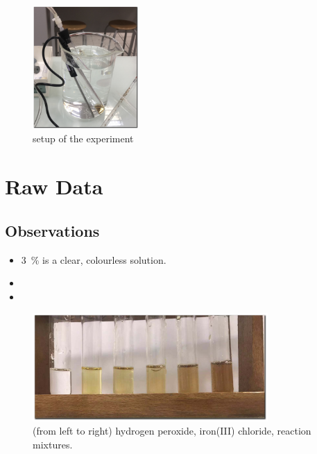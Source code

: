 \documentclass[a4paper, 12pt]{article}
\begin{document}
\begin{figure}[hbt]
    \centering
    \includegraphics[width=0.36\textwidth]{imgs/setup}
    \caption{setup of the experiment}
    \label{fig:setup}
\end{figure}


\section*{Raw Data}
\subsection*{Observations}
\begin{itemize}
    \item \SI{3}{\percent}  is a clear, colourless solution.
    \item 
    \item 
\end{itemize}

\begin{figure}[h!tb]
    \centering
    \includegraphics[width=0.8\textwidth]{imgs/colours}
    \caption{(from left to right) hydrogen peroxide, iron(III) chloride, reaction mixtures. }
    \label{fig:colours}
\end{figure}
\end{document}

